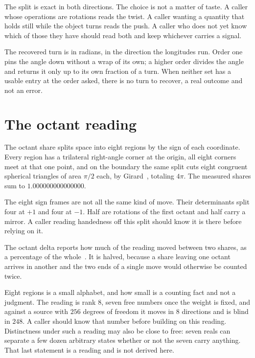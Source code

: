 The split is exact in both directions. The choice is not a matter of taste. A caller whose operations are rotations reads the twist. A caller wanting a quantity that holds still while the object turns reads the push. A caller who does not yet know which of those they have should read both and keep whichever carries a signal.

The recovered turn is in radians, in the direction the longitudes run. Order one pins the angle down without a wrap of its own; a higher order divides the angle and returns it only up to its own fraction of a turn. When neither set has a usable entry at the order asked, there is no turn to recover, a real outcome and not an error.

\section{The octant reading}

The octant share splits space into eight regions by the sign of each coordinate. Every region has a trilateral right-angle corner at the origin, all eight corners meet at that one point, and on the boundary the same split cuts eight congruent spherical triangles of area \(\pi/2\) each, by Girard~\cite[images f58 to f62]{src:Girard-1629}, totaling \(4\pi\). The measured shares sum to \(1.000000000000000\).

The eight sign frames are not all the same kind of move. Their determinants split four at \(+1\) and four at \(-1\). Half are rotations of the first octant and half carry a mirror. A caller reading handedness off this split should know it is there before relying on it.

The octant delta reports how much of the reading moved between two shares, as a percentage of the whole~\cite[Section~4.1, Proposition~4.2]{src:Levin-and-Peres-2017}. It is halved, because a share leaving one octant arrives in another and the two ends of a single move would otherwise be counted twice.

Eight regions is a small alphabet, and how small is a counting fact and not a judgment. The reading is rank \(8\), seven free numbers once the weight is fixed, and against a source with \(256\) degrees of freedom it moves in \(8\) directions and is blind in \(248\). A caller should know that number before building on this reading. Distinctness under such a reading may also be close to free: seven reals can separate a few dozen arbitrary states whether or not the seven carry anything. That last statement is a reading and is not derived here.

